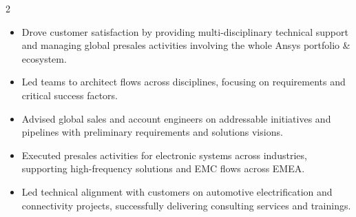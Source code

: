 \documentclass[9pt,a4paper,ragged2e,withhyper]{altacv} %
\begin{document}
\begin{paracol}{2}
\begin{itemize}
\item Drove customer satisfaction by providing multi-disciplinary technical support and managing global presales activities involving the whole Ansys portfolio \& ecosystem.
\item Led teams to architect flows across disciplines, focusing on requirements and critical success factors.
\item Advised global sales and account engineers on addressable initiatives and pipelines with preliminary requirements and solutions visions.
\end{itemize}
\divider

\begin{itemize}
\item Executed presales activities for electronic systems across industries, supporting high-frequency solutions and EMC flows across EMEA.
\item Led technical alignment with customers on automotive electrification and connectivity projects, successfully delivering consulting services and trainings.
\end{itemize}
\divider


\end{paracol}
\end{document}
